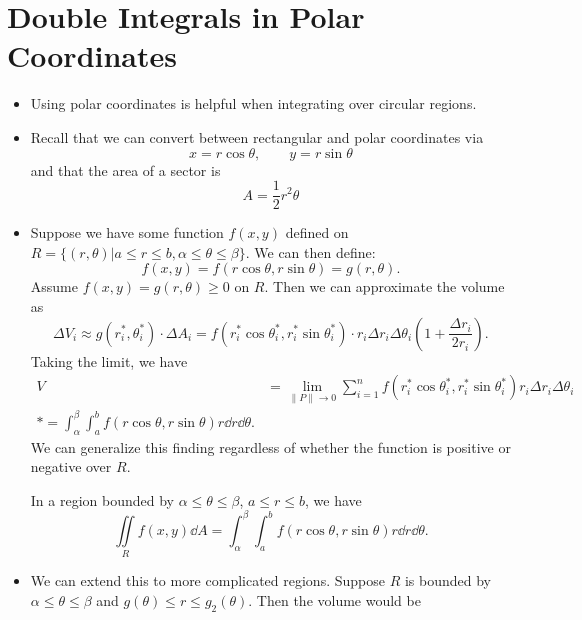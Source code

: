 \section{Double Integrals in Polar Coordinates}
\begin{itemize}
    \item Using polar coordinates is helpful when integrating over circular regions.
    \item Recall that we can convert between rectangular and polar coordinates via 
    \begin{equation}
        x = r\cos\theta,\qquad y=r\sin\theta
    \end{equation}
    and that the area of a sector is 
    \begin{equation}
        A = \frac{1}{2}r^2\theta
    \end{equation}
    \item Suppose we have some function $f(x,y)$ defined on $R=\{(r,\theta)|a\le r \le b, \alpha\le \theta\le \beta\}.$ We can then define: 
    \begin{equation}
        f(x,y)=f(r\cos\theta,r\sin\theta)=g(r,\theta).
    \end{equation}
    Assume $f(x,y)=g(r,\theta) \ge 0$ on $R$. Then we can approximate the volume as 
    \begin{equation}
        \Delta V_i \approx g(r_i^*,\theta_i^*)\cdot \Delta A_i = f(r_i^*\cos\theta^*_i,r_i^*\sin\theta^*_i) \cdot r_i\Delta r_i \Delta \theta_i \left(1+\frac{\Delta r_i}{2r_i}\right).
    \end{equation}
    Taking the limit, we have 
    \begin{align}
        V &= \lim_{\lVert P\rVert \rightarrow 0} \sum_{i=1}^n f(r_i^*\cos\theta_i^*, r_i^* \sin\theta^*_i)r_i\Delta r_i \Delta \theta_i \\ 
        *= \int_\alpha^\beta \int_a^b f(r\cos\theta,r\sin\theta)r \dd{r}\dd{\theta}.
    \end{align}
    We can generalize this finding regardless of whether the function is positive or negative over $R$.
    \begin{idea}
        In a region bounded by $\alpha \le \theta \le \beta$, $a\le r\le b$, we have 
        \begin{equation}
            \iint\limits_{R} f(x,y)\dd{A}  =\int_\alpha^\beta \int_a^b f(r\cos\theta,r\sin\theta)r\dd{r}\dd{\theta}.
        \end{equation}
    \end{idea}
    \item We can extend this to more complicated regions. Suppose $R$ is bounded by $\alpha \le \theta \le \beta$ and $g(\theta) \le r \le g_2(\theta)$. Then the volume would be 

\end{itemize}
